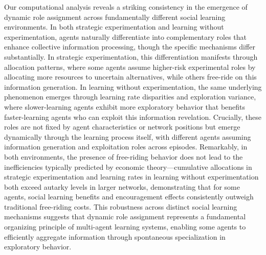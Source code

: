 Our computational analysis reveals a striking consistency in the emergence of dynamic role assignment across fundamentally different social learning environments. In both strategic experimentation and learning without experimentation, agents naturally differentiate into complementary roles that enhance collective information processing, though the specific mechanisms differ substantially. In strategic experimentation, this differentiation manifests through allocation patterns, where some agents assume higher-risk experimental roles by allocating more resources to uncertain alternatives, while others free-ride on this information generation. In learning without experimentation, the same underlying phenomenon emerges through learning rate disparities and exploration variance, where slower-learning agents exhibit more exploratory behavior that benefits faster-learning agents who can exploit this information revelation. Crucially, these roles are not fixed by agent characteristics or network positions but emerge dynamically through the learning process itself, with different agents assuming information generation and exploitation roles across episodes. Remarkably, in both environments, the presence of free-riding behavior does not lead to the inefficiencies typically predicted by economic theory—cumulative allocations in strategic experimentation and learning rates in learning without experimentation both exceed autarky levels in larger networks, demonstrating that for some agents, social learning benefits and encouragement effects consistently outweigh traditional free-riding costs. This robustness across distinct social learning mechanisms suggests that dynamic role assignment represents a fundamental organizing principle of multi-agent learning systems, enabling some agents to efficiently aggregate information through spontaneous specialization in exploratory behavior.




